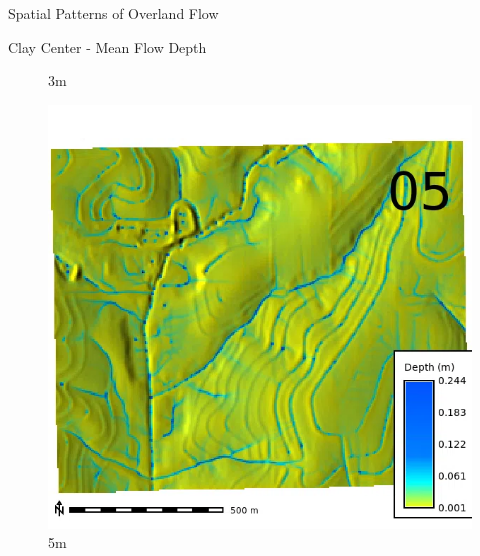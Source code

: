 \documentclass[
  ignorenonframetext,
]{beamer}
\begin{document}
\begin{frame}{Spatial Patterns of Overland Flow}
\begin{block}{Clay Center - Mean Flow Depth}
\begin{figure}[H]
{}

\caption{3m}

\end{figure}%

\begin{figure}[H]

{\centering \includegraphics{../output/clay-center/sensitivity_1/clay-center_depth_5_1_s_average.webp}

}

\caption{5m}

\end{figure}%

\begin{figure}[H]


\end{figure}
\end{block}
\end{frame}
\end{document}
